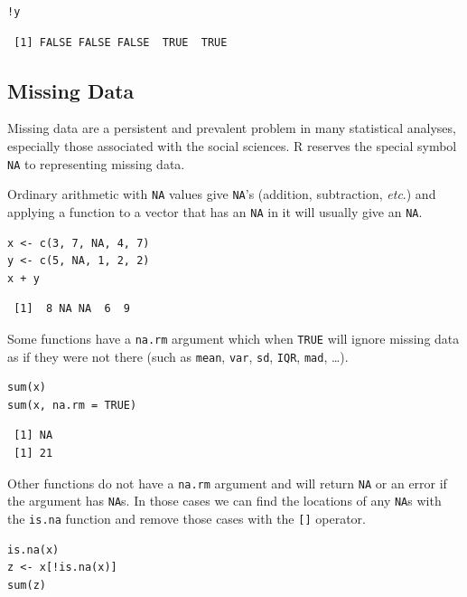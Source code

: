 \documentclass[captions=tableheading]{scrbook}
\begin{document}
\begin{verbatim}
!y
\end{verbatim}

\begin{verbatim}
 [1] FALSE FALSE FALSE  TRUE  TRUE
\end{verbatim}
\subsection{Missing Data}
\label{sec-3-1-6}

\label{sub:Missing-Data}

Missing data are a persistent and prevalent problem in many statistical analyses, especially those associated with the social sciences. \textsf{R} reserves the special symbol \texttt{NA} to representing missing data.

Ordinary arithmetic with \texttt{NA} values give \texttt{NA}'s (addition, subtraction, \emph{etc}.) and applying a function to a vector that has an \texttt{NA} in it will usually give an \texttt{NA}.


\begin{verbatim}
x <- c(3, 7, NA, 4, 7)
y <- c(5, NA, 1, 2, 2)
x + y
\end{verbatim}

\begin{verbatim}
 [1]  8 NA NA  6  9
\end{verbatim}

Some functions have a \texttt{na.rm} argument which when \texttt{TRUE} will ignore missing data as if they were not there (such as \texttt{mean}, \texttt{var}, \texttt{sd}, \texttt{IQR}, \texttt{mad}, \ldots{}). 


\begin{verbatim}
sum(x)
sum(x, na.rm = TRUE)
\end{verbatim}

\begin{verbatim}
 [1] NA
 [1] 21
\end{verbatim}

Other functions do not have a \texttt{na.rm} argument and will return \texttt{NA} or an error if the argument has \texttt{NA}s. In those cases we can find the locations of any \texttt{NA}s with the \texttt{is.na} function and remove those cases with the \texttt{[]} operator.


\begin{verbatim}
is.na(x)
z <- x[!is.na(x)]
sum(z)
\end{verbatim}
\end{document}
